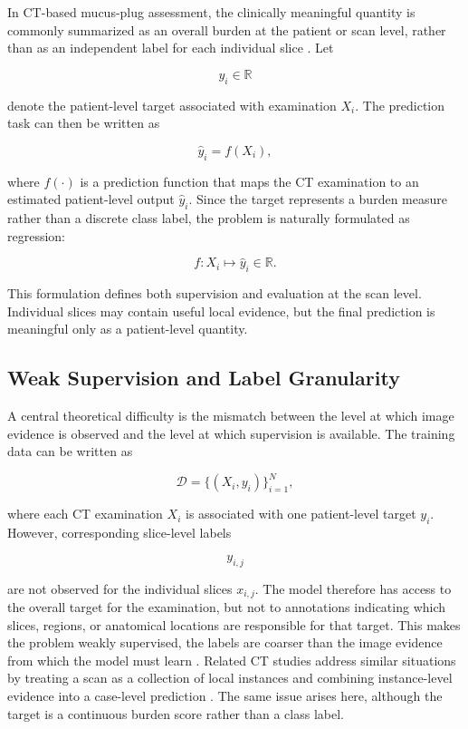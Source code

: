 In CT-based mucus-plug assessment, the clinically meaningful quantity is commonly summarized as an overall burden at the patient or scan level, rather than as an independent label for each individual slice \cite{dunican2018mucus,dunican2018autopsy}. Let

\[
y_i \in \mathbb{R}
\]

denote the patient-level target associated with examination \(X_i\). The prediction task can then be written as

\[
\hat{y}_i = f(X_i),
\]

where \(f(\cdot)\) is a prediction function that maps the CT examination to an estimated patient-level output \(\hat{y}_i\). Since the target represents a burden measure rather than a discrete class label, the problem is naturally formulated as regression:

\[
f : X_i \mapsto \hat{y}_i \in \mathbb{R}.
\]

This formulation defines both supervision and evaluation at the scan level. Individual slices may contain useful local evidence, but the final prediction is meaningful only as a patient-level quantity.


\subsection{Weak Supervision and Label Granularity}
\label{sec:weak_supervision_label_granularity}
A central theoretical difficulty is the mismatch between the level at which image evidence is observed and the level at which supervision is available. The training data can be written as

\[
\mathcal{D} = \{(X_i, y_i)\}_{i=1}^{N},
\]

where each CT examination \(X_i\) is associated with one patient-level target \(y_i\). However, corresponding slice-level labels

\[
y_{i,j}
\]

are not observed for the individual slices \(x_{i,j}\). The model therefore has access to the overall target for the examination, but not to annotations indicating which slices, regions, or anatomical locations are responsible for that target. This makes the problem weakly supervised, the labels are coarser than the image evidence from which the model must learn \cite{ren2023weakly}. Related CT studies address similar situations by treating a scan as a collection of local instances and combining instance-level evidence into a case-level prediction \cite{qi2021drmil,xue2023copdmil}. The same issue arises here, although the target is a continuous burden score rather than a class label.


